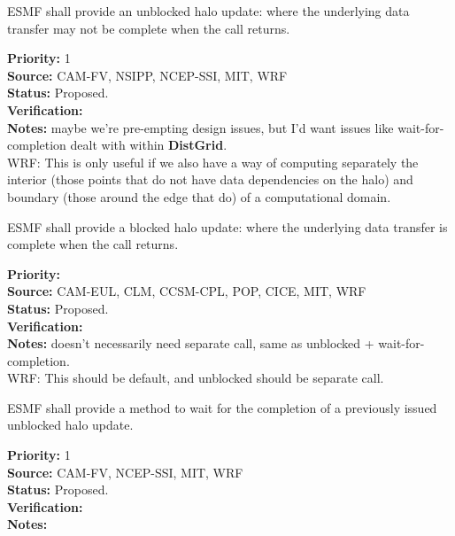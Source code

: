  \label{DG:halo}



ESMF shall provide an unblocked halo update: where the underlying
data transfer may not be complete when the call returns.

\begin{reqlist}
{\bf Priority:} 1 \\ 
{\bf Source:} CAM-FV, NSIPP, NCEP-SSI, MIT, WRF \\
{\bf Status:} Proposed. \\
{\bf Verification:} \\
{\bf Notes:} maybe we're pre-empting design issues, but I'd want
  issues like wait-for-completion dealt with within \textbf{DistGrid}.
\\WRF: This is only useful if we also have a way of computing separately the
interior (those points that do not have data dependencies on the halo)
and boundary (those around the edge that do)
of a computational domain.
\end{reqlist}


ESMF shall provide a blocked halo update: where the underlying
data transfer is complete when the call returns.

\begin{reqlist}
{\bf Priority:} \\
{\bf Source:} CAM-EUL, CLM, CCSM-CPL, POP, CICE, MIT, WRF \\
{\bf Status:} Proposed. \\
{\bf Verification:} \\
{\bf Notes:} doesn't necessarily need separate call, same as unblocked
  + wait-for-completion.
\\WRF: This should be default, and unblocked should be separate call.
\end{reqlist}


ESMF shall provide a method to wait for the completion of a previously
issued unblocked halo update.

\begin{reqlist}
{\bf Priority:} 1 \\ 
{\bf Source:} CAM-FV, NCEP-SSI, MIT, WRF \\
{\bf Status:} Proposed. \\
{\bf Verification:} \\
{\bf Notes:}
\end{reqlist}


